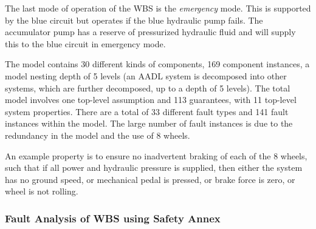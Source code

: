 The last mode of operation of the WBS is the \textit{emergency} mode. This is supported by the blue circuit but operates if the blue hydraulic pump fails. The accumulator pump has a reserve of pressurized hydraulic fluid and will supply this to the blue circuit in emergency mode.

The model contains 30 different kinds of components, 169 component instances, a model nesting depth of 5 levels (an AADL system is decomposed into other systems, which are further decomposed, up to a depth of 5 levels).  The total model involves one top-level assumption and 113 guarantees, with 11 top-level system properties.  There are a total of 33 different fault types and 141 fault instances within the model.  The large number of fault instances is due to the redundancy in the model and the use of 8 wheels. %


An example property is to ensure no inadvertent braking of each of the 8 wheels, such that if all power and hydraulic pressure is supplied, then either the system has no ground speed, or mechanical pedal is pressed, or brake force is zero, or wheel is not rolling.


\subsubsection{Fault Analysis of WBS using Safety Annex}

\iffalse

